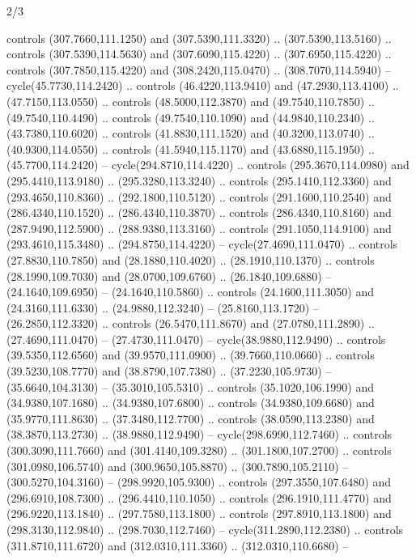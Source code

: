 \begin{flagdescription}{2/3}
\begin{scope}[xshift=0.5\flaglength,yshift=0.5\flagwidth,scale=\stretchfactor]
\begin{scope}[scale=0.001645\flagwidth,yshift=65mm,xshift=-63mm]
\begin{scope}[y=0.80pt, x=0.80pt, yscale=-1,]
\begin{scope}[cm={{1.33333,0.0,0.0,1.33333,(0.0,1e-05)}}]
  controls (307.7660,111.1250) and (307.5390,111.3320) .. (307.5390,113.5160) ..
  controls (307.5390,114.5630) and (307.6090,115.4220) .. (307.6950,115.4220) ..
  controls (307.7850,115.4220) and (308.2420,115.0470) .. (308.7070,114.5940) --
  cycle(45.7730,114.2420) .. controls (46.4220,113.9410) and (47.2930,113.4100)
  .. (47.7150,113.0550) .. controls (48.5000,112.3870) and (49.7540,110.7850) ..
  (49.7540,110.4490) .. controls (49.7540,110.1090) and (44.9840,110.2340) ..
  (43.7380,110.6020) .. controls (41.8830,111.1520) and (40.3200,113.0740) ..
  (40.9300,114.0550) .. controls (41.5940,115.1170) and (43.6880,115.1950) ..
  (45.7700,114.2420) -- cycle(294.8710,114.4220) .. controls (295.3670,114.0980)
  and (295.4410,113.9180) .. (295.3280,113.3240) .. controls (295.1410,112.3360)
  and (293.4650,110.8360) .. (292.1800,110.5120) .. controls (291.1600,110.2540)
  and (286.4340,110.1520) .. (286.4340,110.3870) .. controls (286.4340,110.8160)
  and (287.9490,112.5900) .. (288.9380,113.3160) .. controls (291.1050,114.9100)
  and (293.4610,115.3480) .. (294.8750,114.4220) -- cycle(27.4690,111.0470) ..
  controls (27.8830,110.7850) and (28.1880,110.4020) .. (28.1910,110.1370) ..
  controls (28.1990,109.7030) and (28.0700,109.6760) .. (26.1840,109.6880) --
  (24.1640,109.6950) -- (24.1640,110.5860) .. controls (24.1600,111.3050) and
  (24.3160,111.6330) .. (24.9880,112.3240) -- (25.8160,113.1720) --
  (26.2850,112.3320) .. controls (26.5470,111.8670) and (27.0780,111.2890) ..
  (27.4690,111.0470) -- (27.4730,111.0470) -- cycle(38.9880,112.9490) ..
  controls (39.5350,112.6560) and (39.9570,111.0900) .. (39.7660,110.0660) ..
  controls (39.5230,108.7770) and (38.8790,107.7380) .. (37.2230,105.9730) --
  (35.6640,104.3130) -- (35.3010,105.5310) .. controls (35.1020,106.1990) and
  (34.9380,107.1680) .. (34.9380,107.6800) .. controls (34.9380,109.6680) and
  (35.9770,111.8630) .. (37.3480,112.7700) .. controls (38.0590,113.2380) and
  (38.3870,113.2730) .. (38.9880,112.9490) -- cycle(298.6990,112.7460) ..
  controls (300.3090,111.7660) and (301.4140,109.3280) .. (301.1800,107.2700) ..
  controls (301.0980,106.5740) and (300.9650,105.8870) .. (300.7890,105.2110) --
  (300.5270,104.3160) -- (298.9920,105.9300) .. controls (297.3550,107.6480) and
  (296.6910,108.7300) .. (296.4410,110.1050) .. controls (296.1910,111.4770) and
  (296.9220,113.1840) .. (297.7580,113.1800) .. controls (297.8910,113.1800) and
  (298.3130,112.9840) .. (298.7030,112.7460) -- cycle(311.2890,112.2380) ..
  controls (311.8710,111.6720) and (312.0310,111.3360) .. (312.0310,110.6680) --

\end{scope}
\end{scope}
\end{scope}
\end{scope}
\end{flagdescription}
